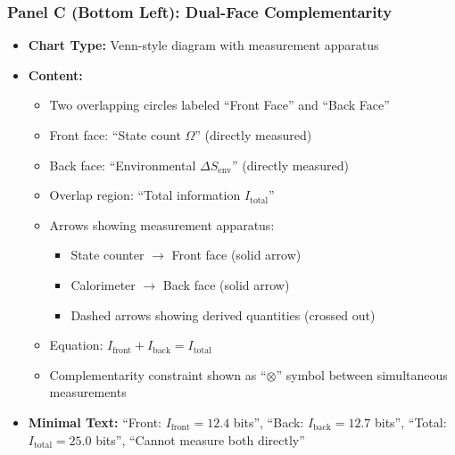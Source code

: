 \subsubsection*{Panel C (Bottom Left): Dual-Face Complementarity}
\begin{itemize}
\item \textbf{Chart Type:} Venn-style diagram with measurement apparatus
\item \textbf{Content:}
  \begin{itemize}
  \item Two overlapping circles labeled ``Front Face'' and ``Back Face''
  \item Front face: ``State count $\Omega$'' (directly measured)
  \item Back face: ``Environmental $\Delta S_{\text{env}}$'' (directly measured)
  \item Overlap region: ``Total information $I_{\text{total}}$''
  \item Arrows showing measurement apparatus:
    \begin{itemize}
    \item State counter $\to$ Front face (solid arrow)
    \item Calorimeter $\to$ Back face (solid arrow)
    \item Dashed arrows showing derived quantities (crossed out)
    \end{itemize}
  \item Equation: $I_{\text{front}} + I_{\text{back}} = I_{\text{total}}$
  \item Complementarity constraint shown as ``$\otimes$'' symbol between simultaneous measurements
  \end{itemize}
\item \textbf{Minimal Text:} ``Front: $I_{\text{front}} = 12.4$ bits'', ``Back: $I_{\text{back}} = 12.7$ bits'', ``Total: $I_{\text{total}} = 25.0$ bits'', ``Cannot measure both directly''
\end{itemize}


